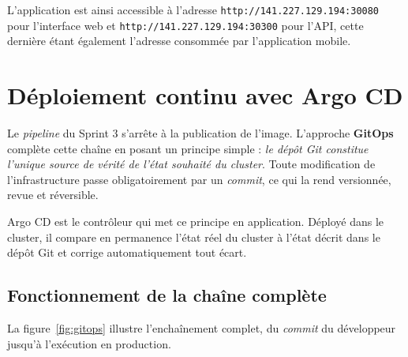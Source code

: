 L'application est ainsi accessible à l'adresse \texttt{http://}\allowbreak\texttt{141.227.129.194:30080}
pour l'interface web et \texttt{http://}\allowbreak\texttt{141.227.129.194:30300} pour l'API, cette dernière
étant également l'adresse consommée par l'application mobile.

\section{Déploiement continu avec Argo CD}
Le \textit{pipeline} du Sprint 3 s'arrête à la publication de l'image. L'approche
\textbf{GitOps} complète cette chaîne en posant un principe simple : \emph{le dépôt Git
constitue l'unique source de vérité de l'état souhaité du cluster}. Toute modification de
l'infrastructure passe obligatoirement par un \textit{commit}, ce qui la rend versionnée,
revue et réversible.

Argo CD est le contrôleur qui met ce principe en application. Déployé dans le cluster, il
compare en permanence l'état réel du cluster à l'état décrit dans le dépôt Git et corrige
automatiquement tout écart.

\subsection{Fonctionnement de la chaîne complète}
La figure~\ref{fig:gitops} illustre l'enchaînement complet, du \textit{commit} du
développeur jusqu'à l'exécution en production.

